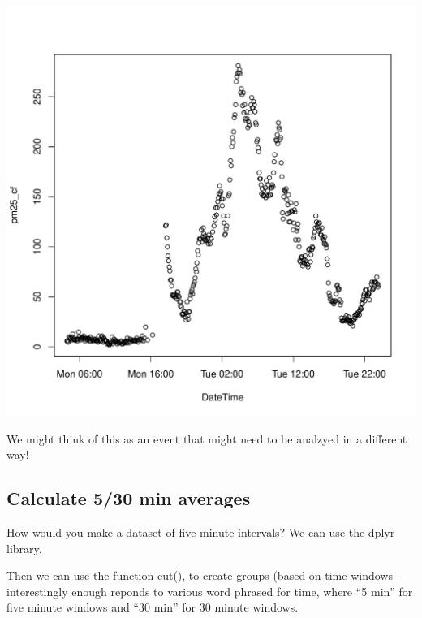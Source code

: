 \documentclass{article}\usepackage[]{graphicx}\usepackage[]{color}
\makeatletter
\def\maxwidth{ %
  \ifdim\Gin@nat@width>\linewidth
    \linewidth
  \else
    \Gin@nat@width
  \fi
}
\newenvironment{knitrout}{}{} %
\def\maxwidth{ %
  \ifdim\Gin@nat@width>\linewidth
    \linewidth
  \else
    \Gin@nat@width
  \fi
}
\makeatother
\begin{document}
\begin{knitrout}
\color{fgcolor}
\includegraphics[width=\maxwidth]{figure/unnamed-chunk-13-1} 

\end{knitrout}

We might think of this as an event that might need to be analzyed in a different way!  

\subsection{Calculate 5/30 min averages}

How would you make a dataset of five minute intervals? We can use the dplyr library. 

Then we can use the function cut(), to create groups (based on time windows -- interestingly enough reponds to various word phrased for time, where ``5 min'' for five minute windows and ``30 min'' for 30 minute windows. 
\end{document}
